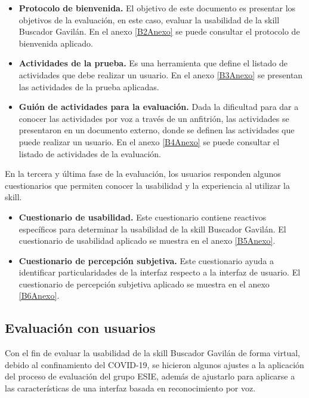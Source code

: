 \begin{itemize}
  \item \textbf{Protocolo de bienvenida.} El objetivo de este documento es presentar los objetivos de la evaluación, en este caso, evaluar la usabilidad de la skill Buscador Gavilán. En el anexo \ref{B2Anexo} se puede consultar el protocolo de bienvenida aplicado.
  \item \textbf{Actividades de la prueba.} Es una herramienta que define el listado de actividades que debe realizar un usuario. En el anexo \ref{B3Anexo} se presentan las actividades de la prueba aplicadas.
  \item \textbf{Guión de actividades para la evaluación.} Dada la dificultad para dar a conocer las actividades por voz a través de un anfitrión, las actividades se presentaron en un documento externo, donde se definen las actividades que puede realizar un usuario. En el anexo \ref{B4Anexo} se puede consultar el listado de actividades de la evaluación.
\end{itemize}

En la tercera y última fase de la evaluación, los usuarios responden algunos cuestionarios que permiten conocer la usabilidad y la experiencia al utilizar la skill.

\begin{itemize}
  \item \textbf{Cuestionario de usabilidad.} Este cuestionario contiene reactivos específicos para determinar la usabilidad de la skill Buscador Gavilán. El cuestionario de usabilidad aplicado se muestra en el anexo \ref{B5Anexo}.
  \item \textbf{Cuestionario de percepción subjetiva.} Este cuestionario ayuda a identificar particularidades de la interfaz respecto a la interfaz de usuario. El cuestionario de percepción subjetiva aplicado se muestra en el anexo \ref{B6Anexo}.
\end{itemize}


\subsection{Evaluación con usuarios}
\label{EvaluacionUsuarioscapIV}

Con el fin de evaluar la usabilidad de la skill Buscador Gavilán de forma virtual, debido al confinamiento del COVID-19, se hicieron algunos ajustes a la aplicación del proceso de evaluación del grupo ESIE, además de ajustarlo para aplicarse a las características de una interfaz basada en reconocimiento por voz.

